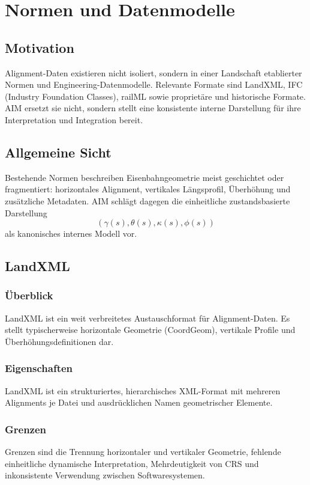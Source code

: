 \chapter{Normen und Datenmodelle}
\section*{Motivation}
Alignment-Daten existieren nicht isoliert, sondern in einer Landschaft
etablierter Normen und Engineering-Datenmodelle. Relevante Formate sind
LandXML, IFC (Industry Foundation Classes), railML sowie proprietäre und
historische Formate. AIM ersetzt sie nicht, sondern stellt eine konsistente
interne Darstellung für ihre Interpretation und Integration bereit.

\section{Allgemeine Sicht}
Bestehende Normen beschreiben Eisenbahngeometrie meist geschichtet oder
fragmentiert: horizontales Alignment, vertikales Längsprofil, Überhöhung und
zusätzliche Metadaten. AIM schlägt dagegen die einheitliche zustandsbasierte
Darstellung
\[
(\gamma(s),\theta(s),\kappa(s),\phi(s))
\]
als kanonisches internes Modell vor.

\section{LandXML}
\subsection{Überblick}
LandXML ist ein weit verbreitetes Austauschformat für Alignment-Daten. Es
stellt typischerweise horizontale Geometrie (CoordGeom), vertikale Profile und
Überhöhungsdefinitionen dar.

\subsection{Eigenschaften}
LandXML ist ein strukturiertes, hierarchisches XML-Format mit mehreren
Alignments je Datei und ausdrücklichen Namen geometrischer Elemente.

\subsection{Grenzen}
Grenzen sind die Trennung horizontaler und vertikaler Geometrie, fehlende
einheitliche dynamische Interpretation, Mehrdeutigkeit von CRS und
inkonsistente Verwendung zwischen Softwaresystemen.

